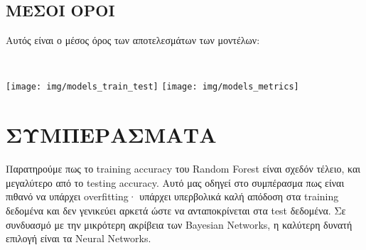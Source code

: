 \subsection{ΜΕΣΟΙ ΟΡΟΙ}

        Αυτός είναι ο μέσος όρος των αποτελεσμάτων των μοντέλων:
        \begin{table}[ht] \noindent\centering\tt
        \end{table}

        \begin{multicols}{2} \centering \noindent
            \texttt{[image: img/models\_train\_test]}
            \texttt{[image: img/models\_metrics]}
        \end{multicols}

\section{ΣΥΜΠΕΡΑΣΜΑΤΑ}
    Παρατηρούμε πως το training accuracy του Random Forest είναι σχεδόν τέλειο, και μεγαλύτερο από το testing accuracy.
    Αυτό μας οδηγεί στο συμπέρασμα πως είναι πιθανό να υπάρχει overfitting· υπάρχει υπερβολικά καλή απόδοση στα training δεδομένα και δεν γενικεύει αρκετά ώστε να ανταποκρίνεται στα test δεδομένα.
    Σε συνδυασμό με την μικρότερη ακρίβεια των Bayesian Networks, η καλύτερη δυνατή επιλογή είναι τα Neural Networks.